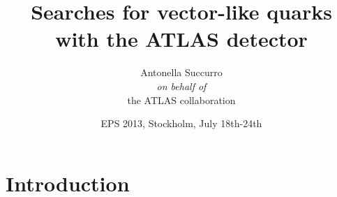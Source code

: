 \documentclass[xcolor=dvipsnames,10pt]{beamer}
\title[]{Searches for vector-like quarks\\ with the ATLAS detector}
\author[A Succurro]{Antonella Succurro\\ \vspace{\baselineskip}\textit{\small on behalf of}\\ the ATLAS collaboration}
\institute[\, \emph{IFAE Barcelona}]{}
\date{EPS 2013, Stockholm, July 18th-24th}
\begin{document}
\frame{

\vspace{-.8cm}


\maketitle\centering

\vspace{-.8cm}

}


\section{Introduction}
\end{document}
